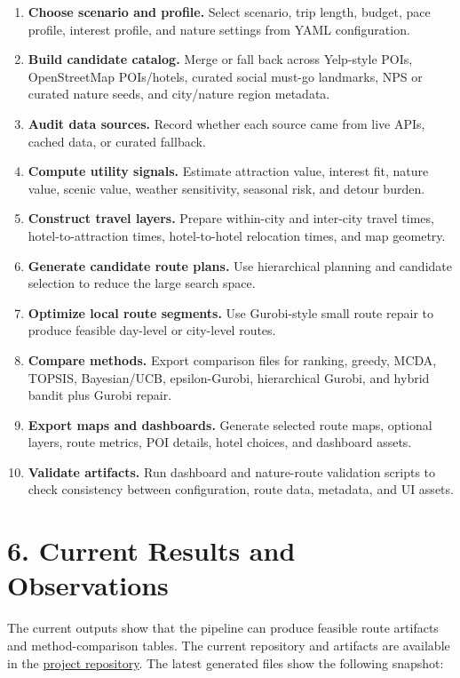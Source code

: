 \documentclass[11pt,a4paper]{article}
\begin{document}
\begin{enumerate}
    \item \textbf{Choose scenario and profile.} Select scenario, trip length, budget, pace profile, interest profile, and nature settings from YAML configuration.
    \item \textbf{Build candidate catalog.} Merge or fall back across Yelp-style POIs, OpenStreetMap POIs/hotels, curated social must-go landmarks, NPS or curated nature seeds, and city/nature region metadata.
    \item \textbf{Audit data sources.} Record whether each source came from live APIs, cached data, or curated fallback.
    \item \textbf{Compute utility signals.} Estimate attraction value, interest fit, nature value, scenic value, weather sensitivity, seasonal risk, and detour burden.
    \item \textbf{Construct travel layers.} Prepare within-city and inter-city travel times, hotel-to-attraction times, hotel-to-hotel relocation times, and map geometry.
    \item \textbf{Generate candidate route plans.} Use hierarchical planning and candidate selection to reduce the large search space.
    \item \textbf{Optimize local route segments.} Use Gurobi-style small route repair to produce feasible day-level or city-level routes.
    \item \textbf{Compare methods.} Export comparison files for ranking, greedy, MCDA, TOPSIS, Bayesian/UCB, epsilon-Gurobi, hierarchical Gurobi, and hybrid bandit plus Gurobi repair.
    \item \textbf{Export maps and dashboards.} Generate selected route maps, optional layers, route metrics, POI details, hotel choices, and dashboard assets.
    \item \textbf{Validate artifacts.} Run dashboard and nature-route validation scripts to check consistency between configuration, route data, metadata, and UI assets.
\end{enumerate}

\section*{6. Current Results and Observations}

\noindent The current outputs show that the pipeline can produce feasible route artifacts and method-comparison tables. The current repository and artifacts are available in the \href{https://github.com/Ztang-Yit-Xiaang/weather-aware-travel-itinerary-optimization}{project repository}. The latest generated files show the following snapshot:
\end{document}
